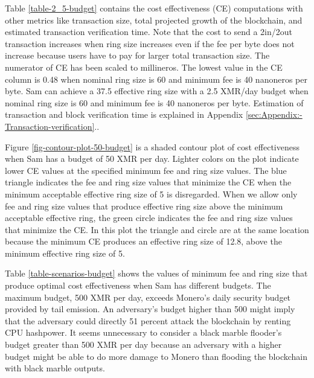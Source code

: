 \documentclass[english]{article}
\begin{document}
Table \ref{table-2_5-budget} contains the cost effectiveness (CE)
computations with other metrics like transaction size, total projected
growth of the blockchain, and estimated transaction verification time.
Note that the cost to send a 2in/2out transaction increases when ring
size increases even if the fee per byte does not increase because
users have to pay for larger total transaction size. The numerator
of CE has been scaled to millineros. The lowest value in the CE column
is 0.48 when nominal ring size is 60 and minimum fee is 40 nanoneros
per byte. Sam can achieve a 37.5 effective ring size with a 2.5 XMR/day
budget when nominal ring size is 60 and minimum fee is 40 nanoneros
per byte. Estimation of transaction and block verification time is
explained in Appendix \ref{sec:Appendix:-Transaction-verification}..

Figure \ref{fig-contour-plot-50-budget} is a shaded contour plot
of cost effectiveness when Sam has a budget of 50 XMR per day. Lighter
colors on the plot indicate lower CE values at the specified minimum
fee and ring size values. The blue triangle indicates the fee and
ring size values that minimize the CE when the minimum acceptable
effective ring size of 5 is disregarded. When we allow only fee and
ring size values that produce effective ring size above the minimum
acceptable effective ring, the green circle indicates the fee and
ring size values that minimize the CE. In this plot the triangle and
circle are at the same location because the minimum CE produces an
effective ring size of 12.8, above the minimum effective ring size
of 5. 

Table \ref{table-scenarios-budget} shows the values of minimum fee
and ring size that produce optimal cost effectiveness when Sam has
different budgets. The maximum budget, 500 XMR per day, exceeds Monero's
daily security budget provided by tail emission. An adversary's budget
higher than 500 might imply that the adversary could directly 51 percent
attack the blockchain by renting CPU hashpower. It seems unnecessary
to consider a black marble flooder's budget greater than 500 XMR per
day because an adversary with a higher budget might be able to do
more damage to Monero than flooding the blockchain with black marble
outputs.

\begin{landscape}
\footnotesize{

}
\end{landscape}
\end{document}
